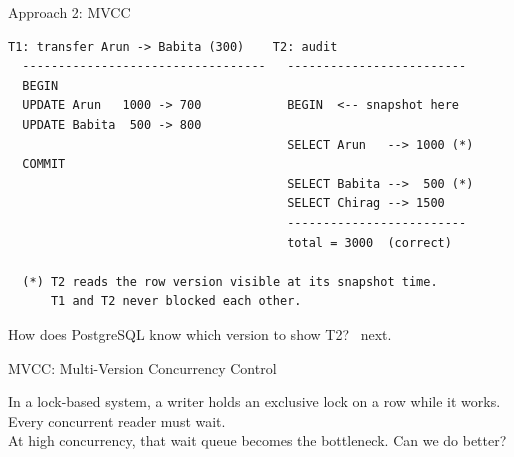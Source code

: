 \documentclass[aspectratio=169,10pt]{beamer}
\begin{document}
\begin{frame}[fragile]{Approach 2: MVCC}

\begin{lstlisting}[style=ascii]
  T1: transfer Arun -> Babita (300)    T2: audit
  ----------------------------------   -------------------------
  BEGIN
  UPDATE Arun   1000 -> 700            BEGIN  <-- snapshot here
  UPDATE Babita  500 -> 800
                                       SELECT Arun   --> 1000 (*)
  COMMIT
                                       SELECT Babita -->  500 (*)
                                       SELECT Chirag --> 1500
                                       -------------------------
                                       total = 3000  (correct)

  (*) T2 reads the row version visible at its snapshot time.
      T1 and T2 never blocked each other.
\end{lstlisting}

{\small How does PostgreSQL know which version to show T2? \textrightarrow\ next.}

\end{frame}

\begin{frame}{MVCC: Multi-Version Concurrency Control}

  \begin{block}{}
    In a lock-based system, a writer holds an exclusive lock on a row
    while it works.  Every concurrent reader must wait.\\[0.4em]
    At high concurrency, that wait queue becomes the bottleneck.
    Can we do better?
  \end{block}

\end{frame}
\end{document}
